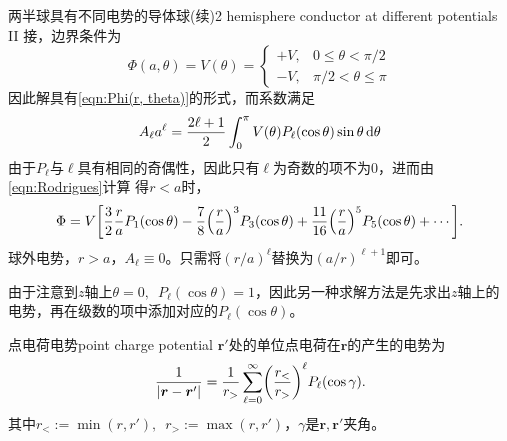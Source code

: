 \begin{example}{两半球具有不同电势的导体球(续)}{2 hemisphere conductor at different potentials II}
    接，边界条件为
    \[
        \Phi(a,\theta) = V(\theta) =
        \begin{cases}
            +V,&0 \leqslant \theta < \pi/2\\
            -V,&\pi/2 < \theta \leqslant \pi
        \end{cases}
    \]
    因此解具有\eqref{eqn:Phi(r, theta)}的形式，而系数满足
    \[
        A_\ell a^\ell = \frac{2\ell + 1}2\int_0^\pi V(\theta)P_\ell(\cos\theta)\sin\theta\mathop{}\!\mathrm{d}\theta
    \]
    由于$P_\ell$与$\ell$具有相同的奇偶性，因此只有$\ell$为奇数的项不为0，进而由\eqref{eqn:Rodrigues}计算
    得$r < a$时，
    \[
        \Phi = V\biggl[\frac32\frac raP_1(\cos\theta) - \frac78\Bigl(\frac ra\Bigr)^3P_3(\cos\theta) + \frac{11}{16}\Bigl(\frac ra\Bigr)^5P_5(\cos\theta) + \cdots\biggr].
    \]
    \tcblower
    球外电势，$r > a$，$A_\ell \equiv 0$。只需将$(r/a)^\ell$替换为$(a/r)^{\ell+1}$即可。
\end{example}
由于注意到$z$轴上$\theta = 0,\enspace P_\ell(\cos\theta) = 1$，因此另一种求解方法是先求出$z$轴上的电势，再在级数的项中添加对应的$P_\ell(\cos\theta)$。

\begin{example}{点电荷电势}{point charge potential}
    $\bm r'$处的单位点电荷在$\bm r$的产生的电势为
    \begin{equation}
        \label{eqn:1/|r-r'|}
        \frac1{\lvert\bm r - \bm r'\rvert} = \frac1{r_>}\sum_{\ell=0}^\infty\biggl(\frac{r_<}{r_>}\biggr)^\ell P_\ell(\cos\gamma).
    \end{equation}
    其中$r_< := \min(r,r'),\enspace r_> := \max(r,r')$，$\gamma$是$\bm r,\bm r'$夹角。
\end{example}
    
